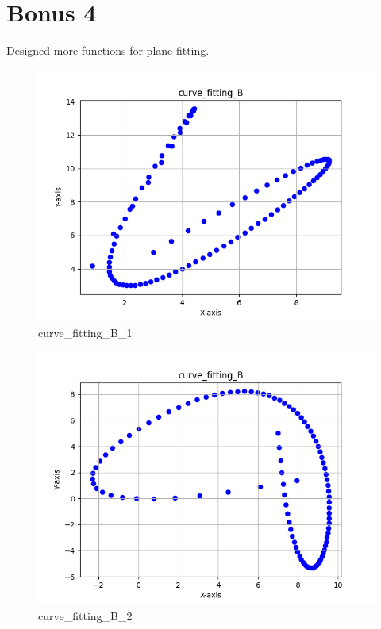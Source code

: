 \documentclass[a4paper]{article}
\begin{document}
\section*{Bonus 4}
Designed more functions for plane fitting.
\begin{figure}[H] 
    \centering
    \includegraphics{../figure/curve_fitting_B_1.png} 
    \caption{curve\_fitting\_B\_1} 
\end{figure}
\begin{figure}[H] 
    \centering
    \includegraphics{../figure/curve_fitting_B_2.png} 
    \caption{curve\_fitting\_B\_2} 
\end{figure}
\end{document}
